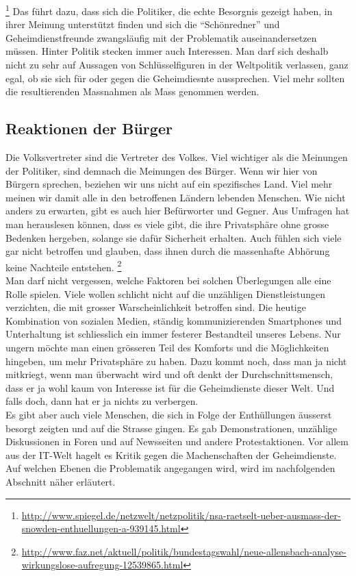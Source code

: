 \footnote{\url{http://www.spiegel.de/netzwelt/netzpolitik/nsa-raetselt-ueber-ausmass-der-snowden-enthuellungen-a-939145.html}}
Das führt dazu, dass sich die Politiker, die echte Besorgnis gezeigt haben, in ihrer Meinung unterstützt finden und sich die ``Schönredner'' und Geheimdienstfreunde zwangsläufig mit der Problematik auseinandersetzen müssen.
Hinter Politik stecken immer auch Interessen. Man darf sich deshalb nicht zu sehr auf Aussagen von Schlüsselfiguren in der Weltpolitik verlassen, ganz egal, ob sie sich für oder gegen die Geheimdiesnte aussprechen. Viel mehr sollten die resultierenden Massnahmen als Mass genommen werden.

\subsection{Reaktionen der Bürger}
Die Volksvertreter sind die Vertreter des Volkes. Viel wichtiger als die Meinungen der Politiker, sind demnach die Meinungen des Bürger. Wenn wir hier von Bürgern sprechen, beziehen wir uns nicht auf ein spezifisches Land. Viel mehr meinen wir damit alle in den betroffenen Ländern lebenden Menschen. Wie nicht anders zu erwarten, gibt es auch hier Befürworter und Gegner. Aus Umfragen hat man herauslesen können, dass es viele gibt, die ihre Privatsphäre ohne grosse Bedenken hergeben, solange sie dafür Sicherheit erhalten. Auch fühlen sich viele gar nicht betroffen und glauben, dass ihnen durch die massenhafte Abhörung keine Nachteile entstehen.
\footnote{\url{http://www.faz.net/aktuell/politik/bundestagswahl/neue-allensbach-analyse-wirkungslose-aufregung-12539865.html}}
\\
Man darf nicht vergessen, welche Faktoren bei solchen Überlegungen alle eine Rolle spielen. Viele wollen schlicht nicht auf die unzähligen Dienstleistungen verzichten, die mit grosser Warscheinlichkeit betroffen sind. Die heutige Kombination von sozialen Medien, ständig kommunizierenden Smartphones und Unterhaltung ist schliesslich ein immer festerer Bestandteil unseres Lebens. Nur ungern möchte man einen grösseren Teil des Komforts und die Möglichkeiten hingeben, um mehr Privatsphäre zu haben. Dazu kommt noch, dass man ja nicht mitkriegt, wenn man überwacht wird und oft denkt der Durchschnittsmensch, dass er ja wohl kaum von Interesse ist für die Geheimdienste dieser Welt. Und falls doch, dann hat er ja nichts zu verbergen.
\\
Es gibt aber auch viele Menschen, die sich in Folge der Enthüllungen äusserst besorgt zeigten und auf die Strasse gingen. Es gab Demonstrationen, unzählige Diskussionen in Foren und auf Newsseiten und andere Protestaktionen. Vor allem aus der IT-Welt hagelt es Kritik gegen die Machenschaften der Geheimdienste. Auf welchen Ebenen die Problematik angegangen wird, wird im nachfolgenden Abschnitt näher erläutert.
